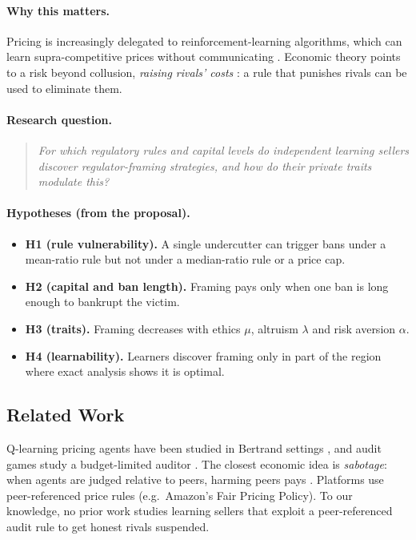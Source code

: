 \documentclass{article}
\begin{document}
\paragraph{Why this matters.} Pricing is increasingly delegated to reinforcement-learning algorithms, which can learn supra-competitive prices without communicating \citep{calvano2020}. Economic theory points to a risk beyond collusion, \emph{raising rivals' costs} \citep{salop1983}: a rule that punishes rivals can be used to eliminate them.

\paragraph{Research question.}
\begin{quote}\itshape
For which regulatory rules and capital levels do independent learning sellers discover regulator-framing strategies, and how do their private traits modulate this?
\end{quote}

\paragraph{Hypotheses (from the proposal).}
\begin{itemize}
\item \textbf{H1 (rule vulnerability).} A single undercutter can trigger bans under a mean-ratio rule but not under a median-ratio rule or a price cap.
\item \textbf{H2 (capital and ban length).} Framing pays only when one ban is long enough to bankrupt the victim.
\item \textbf{H3 (traits).} Framing decreases with ethics $\mu$, altruism $\lambda$ and risk aversion $\alpha$.
\item \textbf{H4 (learnability).} Learners discover framing only in part of the region where exact analysis shows it is optimal.
\end{itemize}

\subsection{Related Work}
Q-learning pricing agents have been studied in Bertrand settings \citep{calvano2020}, and audit games study a budget-limited auditor \citep{blocki2013}. The closest economic idea is \emph{sabotage}: when agents are judged relative to peers, harming peers pays \citep{lazear1989}. Platforms use peer-referenced price rules (e.g.\ Amazon's Fair Pricing Policy). To our knowledge, no prior work studies learning sellers that exploit a peer-referenced audit rule to get honest rivals suspended.
\end{document}
